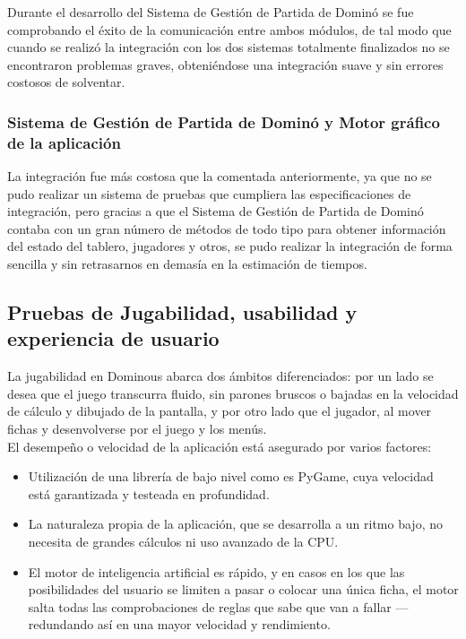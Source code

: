 Durante el desarrollo del Sistema de Gestión de Partida de Dominó se fue comprobando el éxito de la comunicación entre ambos
módulos, de tal modo que cuando se realizó la integración con los dos sistemas totalmente finalizados no se encontraron
problemas graves, obteniéndose una integración suave y sin errores costosos de solventar.

\subsubsection{Sistema de Gestión de Partida de Dominó y Motor gráfico de la aplicación}

La integración fue más costosa que la comentada anteriormente, ya que no se pudo realizar un sistema de pruebas que
cumpliera las especificaciones de integración, pero gracias a que el Sistema de Gestión de Partida de Dominó contaba
con un gran número de métodos de todo tipo para obtener información del estado del tablero, jugadores y otros,
se pudo realizar la integración de forma sencilla y sin retrasarnos en demasía en la estimación de tiempos.


\subsection{Pruebas de Jugabilidad, usabilidad y experiencia de usuario}

La jugabilidad en Dominous abarca dos ámbitos diferenciados: por un lado se desea que el juego transcurra fluido, sin
parones bruscos o bajadas en la velocidad de cálculo y dibujado de la pantalla, y por otro lado que el jugador, al mover
fichas y desenvolverse por el juego y los menús. \\

El desempeño o velocidad de la aplicación está asegurado por varios factores:

\begin{itemize}
    \item Utilización de una librería de bajo nivel como es PyGame, cuya velocidad está garantizada y testeada en profundidad.
    \item La naturaleza propia de la aplicación, que se desarrolla a un ritmo bajo, no necesita de grandes cálculos ni
            uso avanzado de la CPU.
    \item El motor de inteligencia artificial es rápido, y en casos en los que las posibilidades del usuario se limiten
            a pasar o colocar una única ficha, el motor salta todas las comprobaciones de reglas que sabe que van a
            fallar --- redundando así en una mayor velocidad y rendimiento.
\end{itemize}

